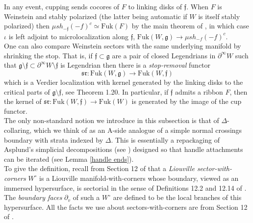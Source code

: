 \documentclass[11pt]{amsart}
\theoremstyle{definition}
\theoremstyle{remark}
\newcommand{\Fuk}{\mathrm{Fuk}}
\numberwithin{equation}{section}
\begin{document}
In any event, cupping sends cocores of $F$ to linking disks of $\mathfrak f$. When $F$ is Weinstein and stably polarized (the latter being automatic if $W$ is itself stably polarized) then $\mu sh_{-\mathfrak f}(\mathfrak -f)^c \simeq \Fuk(F)$ by the main theorem of \cite{GPSIII}, in which case $\iota$ is left adjoint to microlocalization along $\mathfrak f$, $\Fuk(W,\mathfrak g)\to \mu sh_{\mathfrak -f}(\mathfrak -f)^c$.\\ 

One can also compare Weinstein sectors with the same underlying manifold by shrinking the stop. That is, if $\mathfrak{f} \subset \mathfrak{g}$ are a pair of closed Legendrians in $\partial^\infty W$ such that $\mathfrak{g} \setminus \mathfrak{f} \subset \partial^\infty W \setminus \mathfrak{f}$ is Legendrian  then there is a \textit{stop-removal} functor $$\mathfrak{sr}: \Fuk(W, \mathfrak{g}) \rightarrow \Fuk(W, \mathfrak{f})$$ \noindent which is a Verdier localization with kernel generated by the linking disks to the critical parts of $\mathfrak{g} \setminus \mathfrak{f}$, see \cite{GPSI} Theorem 1.20. In particular, if $\mathfrak f$ admits a ribbon $F$, then the kernel of $\mathfrak{sr}\colon \Fuk(W,\mathfrak f)\to \Fuk(W)$ is generated by the image of the cup functor.\\

The only non-standard notion we introduce in this subsection is that of $\Delta$-collaring, which we think of as an A-side analogue of a simple normal crossings boundary with strata indexed by $\Delta$. This is essentially a repackaging of Asplund’s simplicial decompositions (see \cite{Asplund}) designed so that handle attachments can be iterated (see Lemma \ref{handle ends}).\\

To give the definition, recall from Section 12 of \cite{GPSI} that a \textit{Liouville sector-with-corners} $W^\circ$ is a Liouville manifold-with-corners whose boundary, viewed as an immersed hypersurface, is sectorial in the sense of Definitions 12.2 and 12.14 of \cite{GPSI}. The \textit{boundary faces} $\partial_v$ of such a $W^\circ$ are defined to be the local branches of this hypersurface. All the facts we use about sectors-with-corners are from Section 12 of \cite{GPSI}.\\
\end{document}
